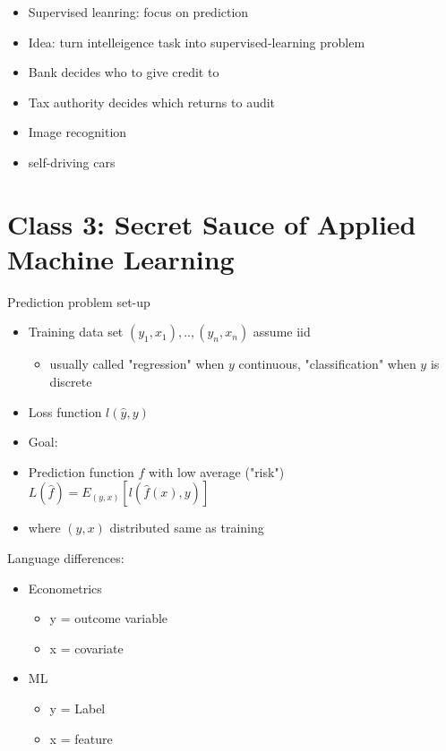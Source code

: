 \documentclass{article}
\begin{document}
\begin{itemize}
    \item Supervised leanring: focus on prediction
    \item Idea: turn intelleigence task into supervised-learning problem
    \item Bank decides who to give credit to
    \item Tax authority decides which returns to audit
    \item Image recognition
    \item self-driving cars
\end{itemize}

\section{Class 3: Secret Sauce of Applied Machine Learning}

Prediction problem set-up

\begin{itemize}
    \item Training data set $(y_1,x_1),.., (y_n,x_n)$ assume iid
    \begin{itemize}
        \item usually called "regression" when $y$ continuous, "classification" when $y$ is discrete
    \end{itemize}
    \item Loss function $l(\hat{y},y)$
    \item Goal:
    \item Prediction function $\hat{f}$ with low average ("risk") $L(\hat{f}) = E_{(y,x)} [l(\hat{f}(x),y)]$
    \item where $(y,x)$ distributed same as training
\end{itemize}


Language differences:
\begin{itemize}
    \item Econometrics
    \begin{itemize}
        \item y = outcome variable
        \item x = covariate
    \end{itemize}
    \item ML
    \begin{itemize}
        \item y = Label
        \item x = feature
    \end{itemize}
\end{itemize}
\end{document}
